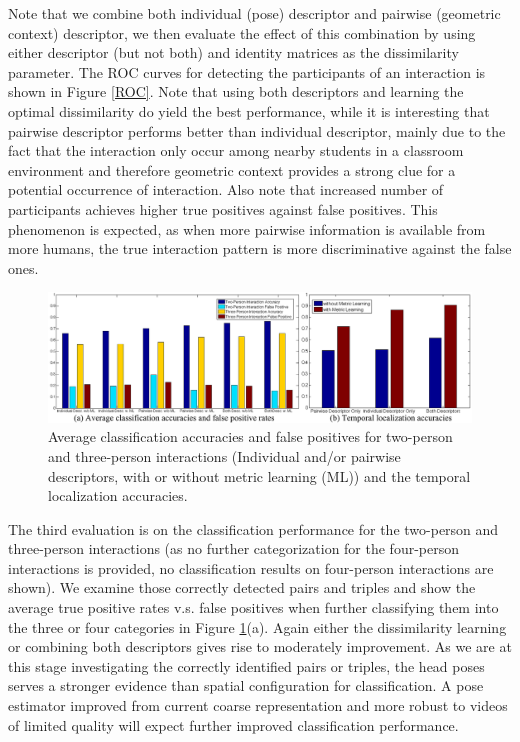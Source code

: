 Note that we combine both individual (pose) descriptor and pairwise (geometric context) descriptor, we then evaluate the effect of this combination by using either descriptor (but not both) and identity matrices as the dissimilarity parameter. The ROC curves for detecting the participants of an interaction is shown in Figure \ref{ROC}. Note that using both descriptors and learning the optimal dissimilarity do yield the best performance, while it is interesting that pairwise descriptor performs better than individual descriptor, mainly due to the fact that the interaction only occur among nearby students in a classroom environment and therefore geometric context provides a strong clue for a potential occurrence of interaction. Also note that increased number of participants achieves higher true positives against false positives. This phenomenon is expected, as when more pairwise information is available from more humans, the true interaction pattern is more discriminative against the false ones.

\begin{figure}[t]
\begin{center}
\includegraphics[scale=2.5]{classtemporal.png}
\end{center}
\caption{ Average classification accuracies and false positives for two-person and three-person interactions (Individual and/or pairwise descriptors, with or without metric learning (ML)) and the temporal localization accuracies.}
\label{classtemporal}
\end{figure}

The third evaluation is on the classification performance for the two-person and three-person interactions (as no further categorization for the four-person interactions is provided, no classification results on four-person interactions are shown). We examine those correctly detected pairs and triples and show the average true positive rates v.s. false positives when further classifying them into the three or four categories in Figure \ref{classtemporal}(a). Again either the dissimilarity learning or combining both descriptors gives rise to moderately improvement. As we are at this stage investigating the correctly identified pairs or triples, the head poses serves a stronger evidence than spatial configuration for classification. A pose estimator improved from current coarse representation and more robust to videos of limited quality will expect further improved classification performance.

